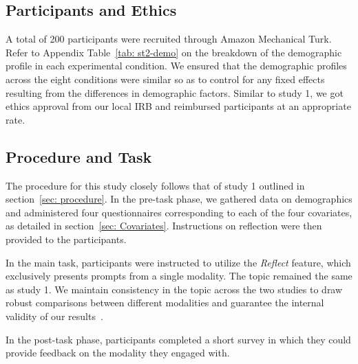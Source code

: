 \subsection{Participants and Ethics}
A total of 200 participants were recruited through Amazon Mechanical Turk. Refer to Appendix Table~\ref{tab: st2-demo} on the breakdown of the demographic profile in each experimental condition. We ensured that the demographic profiles across the eight conditions were similar so as to control for any fixed effects resulting from the differences in demographic factors. Similar to study 1, we got ethics approval from our local IRB and reimbursed participants at an appropriate rate.

\subsection{Procedure and Task}
The procedure for this study closely follows that of study 1 outlined in section~\ref{sec: procedure}. In the pre-task phase, we gathered data on demographics and administered four questionnaires corresponding to each of the four covariates, as detailed in section~\ref{sec: Covariates}. Instructions on reflection were then provided to the participants.

In the main task, participants were instructed to utilize the \textit{Reflect} feature, which exclusively presents prompts from a single modality. The topic remained the same as study 1. We maintain consistency in the topic across the two studies to draw robust comparisons between different modalities and guarantee the internal validity of our results~\cite{cahit2015internal}.

In the post-task phase, participants completed a short survey in which they could provide feedback on the modality they engaged with.